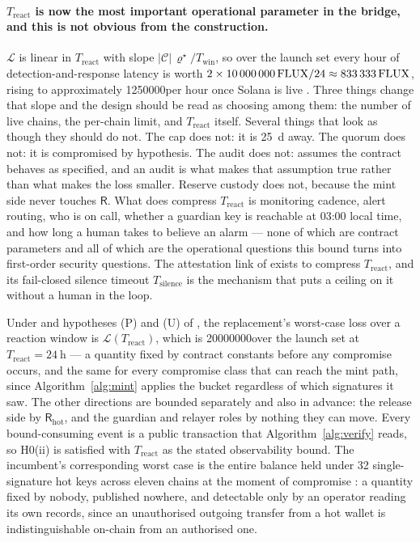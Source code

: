 \paragraph{$T_{\mathrm{react}}$ is now the most important operational parameter in the bridge, and
this is not obvious from the construction.} $\mathcal{L}$ is linear in $T_{\mathrm{react}}$ with
slope $|\mathcal{C}|\,\varrho^\star / T_{\mathrm{win}}$, so over the launch set every hour of
detection-and-response latency is worth $2 \times \num{10000000}\,\mathrm{FLUX} / 24 \approx
\num{833333}\,\mathrm{FLUX}$, rising to approximately \num{1250000}\flux per hour once Solana is live
\srcinferred. Three things change that slope and the design should be read as choosing among them:
the number of live chains, the per-chain limit, and $T_{\mathrm{react}}$ itself. Several things
that look as though they should do not. The cap does not: it is \SI{25}{\day} away. The quorum does
not: it is compromised by hypothesis. The audit does not:  assumes the
contract behaves as specified, and an audit is what makes that assumption true rather than what
makes the loss smaller. Reserve custody does not, because the mint side never touches $\mathsf{R}$.
What does compress $T_{\mathrm{react}}$ is monitoring cadence,
alert routing, who is on call, whether a guardian key is reachable at 03:00 local time, and how long
a human takes to believe an alarm --- none of which are contract parameters and all of which are the
operational questions this bound turns into first-order security questions. The attestation link of
 exists to compress $T_{\mathrm{react}}$, and its fail-closed silence
timeout $T_{\mathrm{silence}}$ is the mechanism that puts a ceiling on it without a human in the loop.
\planned

\begin{proposition}
\label{prop:dominance}
Under  and hypotheses (P) and (U) of , the
replacement's worst-case loss over a reaction window is $\mathcal{L}(T_{\mathrm{react}})$, which is
\num{20000000}\flux over the launch set at $T_{\mathrm{react}} = \SI{24}{\hour}$ --- a quantity fixed
by contract constants before any compromise occurs, and the same for every compromise class that can
reach the mint path, since
Algorithm~\ref{alg:mint} applies the bucket regardless of which signatures it saw. The other
directions are bounded separately and also in advance: the release side by
$\mathsf{R}_{\mathrm{hot}}$, and the guardian and relayer roles by nothing they can move. Every
bound-consuming event is a public
transaction that Algorithm~\ref{alg:verify} reads, so H0(ii) is satisfied with $T_{\mathrm{react}}$
as the stated observability bound. The incumbent's corresponding worst case is the entire balance
held under 32 single-signature hot keys across eleven chains at the moment of compromise
: a quantity fixed by nobody, published nowhere, and
detectable only by an operator reading its own records, since an unauthorised outgoing transfer from
a hot wallet is indistinguishable on-chain from an authorised one. \planned
\end{proposition}

